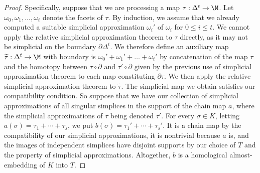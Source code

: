 \begin{proof}
%
\medskip
%
Specifically, suppose that we are processing a map $\tau:\Delta^t\to \M$. Let $\omega_0,\omega_1, \ldots, \omega_t$ denote the facets of $\tau$. By induction, we assume that we already computed a suitable simplicial approximation $\omega_i'$ of $\omega_i$ for $0 \le i \le t$. We cannot apply the relative simplicial approximation theorem to $\tau$ directly, as it may not be simplicial on the boundary $\partial \Delta^t$. We therefore define an auxiliary map $\widetilde \tau:\Delta^t\to\M$ with boundary is $\omega_0'+ \omega_1' + \ldots+\omega_t'$ by concatenation of the map $\tau$ and the homotopy between $\tau\circ\partial$ and $\tau'\circ\partial$ given by the previous use of simplicial approximation theorem to each map constituting $\partial\tau$. We then apply the relative simplicial approximation theorem to  $\widetilde \tau$. The simplicial map we obtain satisfies our compatibility condition.
%
\medskip
%
So suppose that we have our collection of simplicial approximations of all singular simplices in the support of the chain map $a$, where the simplicial approximations of $\tau$ being denoted $\tau'$. For every $\sigma\in K$, letting $a(\sigma)=\tau_1+\cdots+\tau_s$, we put $b(\sigma)=\tau_1'+\cdots+\tau_s'$. It is a chain map by the compatibility of our simplicial approximations, it is nontrivial because $a$ is, and the images of independent simplices have disjoint supports by our choice of $T$ and the property of simplicial approximations. Altogether, $b$ is a homological almost-embedding of $K$ into $T$.
\end{proof}
%
%
